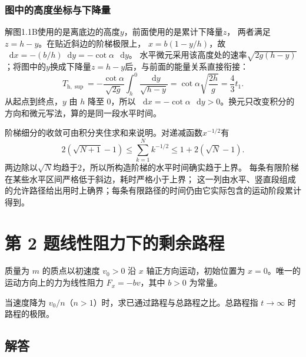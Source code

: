 \documentclass[UTF8,fontset=fandol,a4paper,11pt]{ctexart}
\newcommand{\dd}{\mathop{}\!\mathrm{d}}
\newcommand{\vect}[1]{\bm{#1}}
\newcommand{\tagline}[1]{\noindent{\small\color{muted}#1}\par}
\newcommand{\figcaption}[1]{\par\vspace{2pt}{\small\color{muted}#1}\par}
\begin{document}
\subsubsection*{图中的高度坐标与下降量}
解图1.1B使用的是离底边的高度$y$，前面使用的是累计下降量$z$，
两者满足$z=h-y$。在贴近斜边的阶梯极限上，
$x=b(1-y/h)$，故$\dd x=-(b/h)\dd y=-\cot\alpha\,\dd y$。
水平微元采用该高度处的速率$\sqrt{2g(h-y)}$；将图中的$y$换成下降量$z=h-y$后，与前面的能量关系直接衔接：
\[
T_{\mathrm h,\sup}
=-\frac{\cot\alpha}{\sqrt{2g}}
\int_h^0\frac{\dd y}{\sqrt{h-y}}
=\cot\alpha\sqrt{\frac{2h}{g}}
=\frac43t_1.
\]
从起点到终点，$y$ 由 $h$ 降至 $0$，所以 $\dd x=-\cot\alpha\,\dd y>0$。换元只改变积分的方向和微元写法，算的是同一段水平时间。

阶梯细分的收敛可由积分夹住求和来说明。对递减函数$x^{-1/2}$有
\[
2(\sqrt{N+1}-1)\leq\sum_{k=1}^Nk^{-1/2}
\leq1+2(\sqrt N-1).
\]
两边除以$\sqrt N$均趋于$2$，所以所构造阶梯的水平时间确实趋于上界。
每条有限阶梯在某些水平区间严格低于斜边，耗时严格小于上界；
这一列由水平、竖直段组成的允许路径给出用时上确界；每条有限路径的时间仍由它实际包含的运动阶段累计得到。




\section*{第 2 题\quad 线性阻力下的剩余路程}

\tagline{M-01-02}

质量为 $m$ 的质点以初速度 $v_0>0$ 沿 $x$ 轴正方向运动，初始位置为 $x=0$。唯一的运动方向上的力为线性阻力 $F_x=-bv$，其中 $b>0$ 为常量。

当速度降为 $v_0/n$（$n>1$）时，求已通过路程与总路程之比。总路程指 $t\to\infty$ 时路程的极限。

\begin{center}
\figcaption{图 1.2\quad 运动方向与阻力方向。}
\end{center}

\subsection*{解答}
\end{document}
